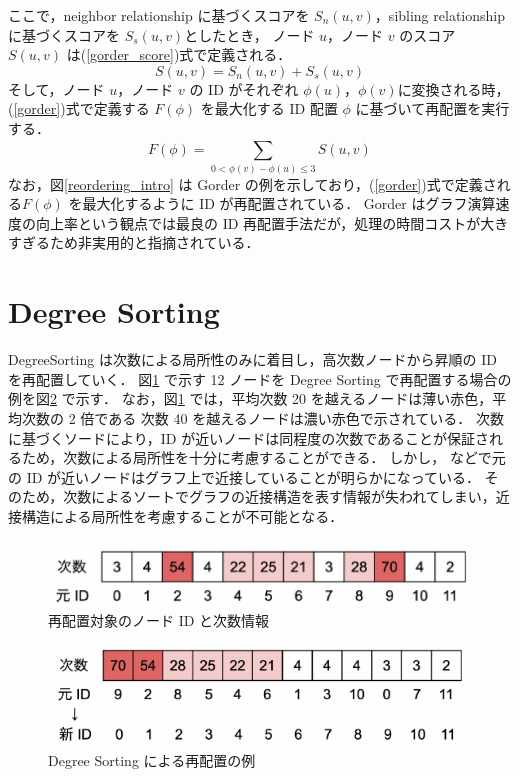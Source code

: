 ここで，neighbor relationship に基づくスコアを $S_{n}(u,v)$，sibling relationship に基づくスコアを $S_{s}(u,v)$としたとき，
ノード $u$，ノード $v$ のスコア $S(u,v)$ は(\ref{gorder_score})式で定義される．
\begin{equation}
  S(u,v) = S_{n}(u,v) + S_{s}(u,v) \label{gorder_score}
\end{equation}
そして，ノード $u$，ノード $v$ の ID がそれぞれ $\phi(u)$，$\phi(v)$に変換される時，
(\ref{gorder})式で定義する $F(\phi)$ を最大化する ID 配置 $\phi$ に基づいて再配置を実行する．
\begin{equation}
  F(\phi) = \sum_{0<\phi(v)-\phi(u)\leq3}^{} S(u,v) \label{gorder}
\end{equation}
なお，図\ref{reordering_intro} は Gorder の例を示しており，(\ref{gorder})式で定義される$F(\phi)$ を最大化するように ID が再配置されている．
Gorder はグラフ演算速度の向上率という観点では最良の ID 再配置手法だが，処理の時間コストが大きすぎるため非実用的と指摘されている\cite{balaji2018graph, faldu2019closer}．
\section{Degree Sorting}
DegreeSorting は次数による局所性のみに着目し，高次数ノードから昇順の ID を再配置していく．
図\ref{Original} で示す 12 ノードを Degree Sorting で再配置する場合の例を図\ref{degree_sorting} で示す．
なお，図\ref{Original} では，平均次数 20 を越えるノードは薄い赤色，平均次数の 2 倍である 次数 40 を越えるノードは濃い赤色で示されている．
次数に基づくソードにより，ID が近いノードは同程度の次数であることが保証されるため，次数による局所性を十分に考慮することができる．
しかし，\cite{balaji2018graph, faldu2019closer} などで元の ID が近いノードはグラフ上で近接していることが明らかになっている．
そのため，次数によるソートでグラフの近接構造を表す情報が失われてしまい，近接構造による局所性を考慮することが不可能となる．
\begin{figure}[t]
  \centering
  \includegraphics[width=\linewidth]{./figure/original.pdf}
  \caption{再配置対象のノード ID と次数情報}
  \label{Original}
\end{figure}
\begin{figure}[t]
  \centering
  \includegraphics[width=\linewidth]{./figure/degree_sorting.pdf}
  \caption{Degree Sorting による再配置の例}
  \label{degree_sorting}
\end{figure}
